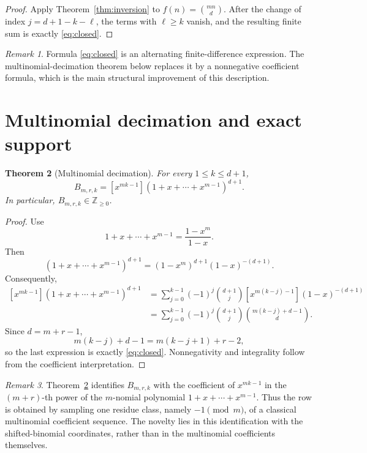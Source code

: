 \documentclass[11pt]{article}
\newtheorem{theorem}{Theorem}[section]
\theoremstyle{definition}
\theoremstyle{remark}
\newtheorem{remark}[theorem]{Remark}
\newcommand{\Z}{\mathbb Z}
\begin{document}
\begin{proof}
Apply Theorem~\ref{thm:inversion} to $f(n)=\binom{mn}{d}$. After the change of
index $j=d+1-k-\ell$, the terms with $\ell\ge k$ vanish, and the resulting
finite sum is exactly \eqref{eq:closed}.
\end{proof}

\begin{remark}
Formula \eqref{eq:closed} is an alternating finite-difference expression.
The multinomial-decimation theorem below replaces it by a nonnegative
coefficient formula, which is the main structural improvement of this
description.
\end{remark}

\section{Multinomial decimation and exact support}
\label{sec:decimation}

\begin{theorem}[Multinomial decimation]
\label{thm:decimation}
For every $1\le k\le d+1$,
\begin{equation}
\label{eq:dec}
 B_{m,r,k}
 =
 [x^{mk-1}](1+x+\cdots+x^{m-1})^{d+1}.
\end{equation}
In particular, $B_{m,r,k}\in\Z_{\ge0}$.
\end{theorem}

\begin{proof}
Use
\[
 1+x+\cdots+x^{m-1}=\frac{1-x^m}{1-x}.
\]
Then
\[
 (1+x+\cdots+x^{m-1})^{d+1}
 =
 (1-x^m)^{d+1}(1-x)^{-(d+1)}.
\]
Consequently,
\[
\begin{aligned}
 [x^{mk-1}](1+x+\cdots+x^{m-1})^{d+1}
 &=
 \sum_{j=0}^{k-1}
 (-1)^j\binom{d+1}{j}
 [x^{m(k-j)-1}](1-x)^{-(d+1)}\\
 &=
 \sum_{j=0}^{k-1}
 (-1)^j\binom{d+1}{j}
 \binom{m(k-j)+d-1}{d}.
\end{aligned}
\]
Since $d=m+r-1$,
\[
 m(k-j)+d-1=m(k-j+1)+r-2,
\]
so the last expression is exactly \eqref{eq:closed}.
Nonnegativity and integrality follow from the coefficient interpretation.
\end{proof}

\begin{remark}
Theorem~\ref{thm:decimation} identifies $B_{m,r,k}$ with the coefficient of
$x^{mk-1}$ in the $(m+r)$-th power of the $m$-nomial polynomial
$1+x+\cdots+x^{m-1}$. Thus the row is obtained by sampling one residue
class, namely $-1\pmod m$, of a classical multinomial coefficient sequence.
The novelty lies in this identification with the shifted-binomial
coordinates, rather than in the multinomial coefficients themselves.
\end{remark}
\end{document}
